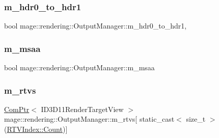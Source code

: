 \hypertarget{classmage_1_1rendering_1_1_output_manager_aee20394757c9f7ebcaf7f8682747d716}{}\label{classmage_1_1rendering_1_1_output_manager_aee20394757c9f7ebcaf7f8682747d716} 
\subsubsection{\texorpdfstring{m\+\_\+hdr0\+\_\+to\+\_\+hdr1}{m\_hdr0\_to\_hdr1}}
{\footnotesize\ttfamily bool mage\+::rendering\+::\+Output\+Manager\+::m\+\_\+hdr0\+\_\+to\+\_\+hdr1\hspace{0.3cm}{\ttfamily [mutable]}, {\ttfamily [private]}}

\hypertarget{classmage_1_1rendering_1_1_output_manager_a3affee412b093ea168b9e4a22c713421}{}\label{classmage_1_1rendering_1_1_output_manager_a3affee412b093ea168b9e4a22c713421} 
\subsubsection{\texorpdfstring{m\+\_\+msaa}{m\_msaa}}
{\footnotesize\ttfamily bool mage\+::rendering\+::\+Output\+Manager\+::m\+\_\+msaa\hspace{0.3cm}{\ttfamily [private]}}

\hypertarget{classmage_1_1rendering_1_1_output_manager_afd0aade15fe5b0f9f4f0bef9f7ea3715}{}\label{classmage_1_1rendering_1_1_output_manager_afd0aade15fe5b0f9f4f0bef9f7ea3715} 
\subsubsection{\texorpdfstring{m\+\_\+rtvs}{m\_rtvs}}
{\footnotesize\ttfamily \hyperlink{namespacemage_ae74f374780900893caa5555d1031fd79}{Com\+Ptr}$<$ I\+D3\+D11\+Render\+Target\+View $>$ mage\+::rendering\+::\+Output\+Manager\+::m\+\_\+rtvs\mbox{[} static\+\_\+cast$<$ size\+\_\+t $>$(\hyperlink{classmage_1_1rendering_1_1_output_manager_af9caebb7e9cacf454d26b827a01e857cae93f994f01c537c4e2f7d8528c3eb5e9}{R\+T\+V\+Index\+::\+Count})\mbox{]}\hspace{0.3cm}{\ttfamily [private]}}

